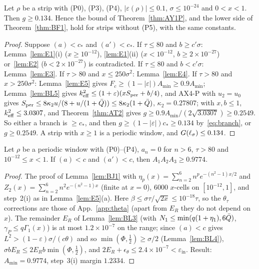\begin{theorem} 
\label{thm:E6}
Let $\rho$ be a strip with (P0), (P3), (P4), $|\varepsilon(\rho)|\le0.1$, $\sigma\le10^{-24}$ and $0<x<1$. Then $g\ge0.134$. Hence the bound of
Theorem~\ref{thm:AY1P}, and the lower side of Theorem~\ref{thm:BF1}, hold for strips without (P5), with the same constants.
\end{theorem}
\begin{proof}
Suppose $(a)<c_*$ and $(a')<c_*$. If $\tau\le80$ and $b\ge c'\sigma$: Lemma~\ref{lem:E1}(i) ($x\ge10^{-12}$), \ref{lem:E1}(ii) ($x<10^{-12}$,
$b\ge2\times10^{-27}$) or~\ref{lem:E2} ($b<2\times10^{-27}$) is contradicted. If $\tau\le80$ and $b<c'\sigma$: Lemma~\ref{lem:E3}. If $\tau>80$ and
$x\le250\sigma^2$: Lemma~\ref{lem:E4}. If $\tau>80$ and $x>250\sigma^2$: Lemma~\ref{lem:E5} gives $F_c\ge(1-|\varepsilon|)A_{\min}\ge0.9A_{\min}$;
Lemma~\ref{lem:BL5} gives $k_{\mathrm{eff}}^2\le(1+\varepsilon)(xS_{\mathrm{per}}+b/4)$, and AX4-P with $u_2=u_0$ gives $S_{\mathrm{per}}\le8\kappa_2u/(8+u/(1+\bar Q))
\le8\kappa_2(1+\bar Q)$, $\kappa_2=0.27807$; with $x,b\le1$, $k_{\mathrm{eff}}^2\le3.0307$, and Theorem~\ref{thm:AT2} gives $g\ge0.9A_{\min}/(2\sqrt{3.0307})\ge0.2549$.
So either a branch is $\ge c_*$, and then $g\ge(1-|\varepsilon|)c_*\ge0.134$ by~\eqref{eq:branch}, or $g\ge0.2549$. A strip with $x\ge1$ is a periodic
window, and $G(\ell_\sigma)\le0.134$.
\end{proof}

\begin{lemma} 
\label{lem:E7}
Let $\rho$ be a periodic window with (P0)--(P4), $a_n=0$ for $n>6$, $\tau>80$ and $10^{-12}\le x<1$. If $(a)<c$ and $(a')<c$, then
$A_1A_2A_3\ge0.9774$.
\end{lemma}
\begin{proof}
The proof of Lemma~\ref{lem:BJ1} with $\eta_p(x)=\sum_{n=2}^6n^pe^{-(n^2-1)x/2}$ and $Z_2(x)=\sum_{n=2}^6n^2e^{-(n^2-1)x}$ (finite at $x=0$), $6000$
$x$-cells on $[10^{-12},1]$, and step~2(i) as in Lemma~\ref{lem:E5}(a). Here $\beta\le\sigma\tau/\sqrt{2x}\le10^{-18}\tau$, so the $\theta_\tau$ corrections are those of
App.~\ref{app:theta} (apart from $E_R$ they do not depend on $x$). The remainder $E_R$ of Lemma~\ref{lem:BL3} (with $N_1\le\min(q(1+\eta_1),6\bar Q)$, $\gamma_P\le q\Gamma_1(x)$) is at most
$1.2\times10^{-7}$ on the range; since $(a)<c$ gives $L^2>(1-\varepsilon)\sigma/(c\theta)$ and so $\min(\Phi,\frac12)\ge\sigma/2$ (Lemma~\ref{lem:BL4}),
$\sigma bE_R\le2E_Rb\min(\Phi,\frac12)$, and $2E_R+\epsilon_\theta\le2.4\times10^{-7}<\varepsilon_{\mathrm{in}}$. Result: $A_{\min}=0.9774$, step~3(i) margin $1.2334$.
\end{proof}

